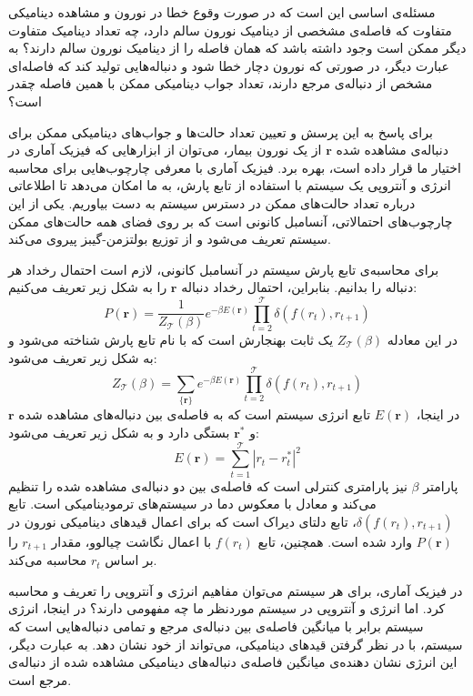 مسئله‌ی اساسی این است که در صورت وقوع خطا در نورون و مشاهده دینامیکی متفاوت که فاصله‌ی مشخصی از دینامیک نورون سالم دارد، چه تعداد دینامیک متفاوت دیگر ممکن است وجود داشته باشد که همان فاصله را از دینامیک نورون سالم دارند؟
به عبارت دیگر، در صورتی که نورون دچار خطا شود و دنباله‌هایی تولید کند که فاصله‌ای مشخص از دنباله‌ی مرجع دارند، تعداد جواب دینامیکی ممکن با همین فاصله چقدر است؟

برای پاسخ به این پرسش و تعیین تعداد حالت‌ها و جواب‌های دینامیکی ممکن برای دنباله‌ی مشاهده شده
\( \mathbf{r} \)
از یک نورون بیمار، می‌توان از ابزارهایی که فیزیک آماری در اختیار ما قرار داده است، بهره برد.
فیزیک آماری با معرفی چارچوب‌هایی برای محاسبه انرژی و آنتروپی یک سیستم با استفاده از تابع پارش، به ما امکان می‌دهد تا اطلاعاتی درباره تعداد حالت‌های ممکن در دسترس سیستم به دست بیاوریم.
یکی از این چارچوب‌های احتمالاتی، آنسامبل کانونی است که بر روی فضای همه حالت‌های ممکن سیستم تعریف می‌شود و از توزیع بولتزمن-گیبز پیروی می‌کند.

برای محاسبه‌ی تابع پارش سیستم در آنسامبل کانونی، لازم است احتمال رخداد هر دنباله را بدانیم.
بنابراین، احتمال رخداد دنباله
\( \mathbf{r} \)
را به شکل زیر تعریف می‌کنیم:
\begin{equation} \label{eq:probability}
    P(\mathbf{r}) = \frac{1}{Z_{\mathcal{T}}(\beta)} e^{-\beta E(\mathbf{r})} \prod_{t=2}^{\mathcal{T}} \delta(f(r_{t}), r_{t+1})
\end{equation}
در این معادله
\( Z_{\mathcal{T}}(\beta) \)
یک ثابت بهنجارش است که با نام تابع پارش شناخته می‌شود و به شکل زیر تعریف می‌شود:
\begin{equation}
    Z_{\mathcal{T}}(\beta) = \sum_{\{ \mathbf{r} \}} e^{-\beta E(\mathbf{r})} \prod_{t=2}^{\mathcal{T}} \delta(f(r_{t}), r_{t+1})
\end{equation}
در اینجا،
\( E(\mathbf{r}) \)
تابع انرژی سیستم است که به فاصله‌ی بین دنباله‌های مشاهده شده
\( \mathbf{r} \) و \( \mathbf{r}^{*} \)
بستگی دارد و به شکل زیر تعریف می‌شود:
\begin{equation}
    E(\mathbf{r}) = \sum_{t=1}^{\mathcal{T}} |r_{t} - r^{*}_{t}|^{2}
\end{equation}
پارامتر
\( \beta \)
نیز پارامتری کنترلی است که فاصله‌ی بین دو دنباله‌ی مشاهده شده را تنظیم می‌کند و معادل با معکوس دما در سیستم‌های ترمودینامیکی است.
تابع
\( \delta(f(r_{t}), r_{t+1}) \)،
تابع دلتای دیراک است که برای اعمال قیدهای دینامیکی نورون در
\( P(\mathbf{r}) \)
وارد شده است.
همچنین، تابع
\( f(r_{t}) \)
با اعمال نگاشت چیالوو، مقدار
\( r_{t+1} \)
را بر اساس
\( r_{t} \)
محاسبه می‌کند.

در فیزیک آماری، برای هر سیستم می‌توان مفاهیم انرژی و آنتروپی را تعریف و محاسبه کرد.
اما انرژی و آنتروپی در سیستم موردنظر ما چه مفهومی دارند؟
در اینجا، انرژی سیستم برابر با میانگین فاصله‌ی بین دنباله‌ی مرجع و تمامی دنباله‌هایی است که سیستم، با در نظر گرفتن قید‌های دینامیکی، می‌تواند از خود نشان دهد.
به عبارت دیگر، این انرژی نشان دهنده‌ی میانگین فاصله‌ی دنباله‌های دینامیکی مشاهده شده از دنباله‌ی مرجع است.

